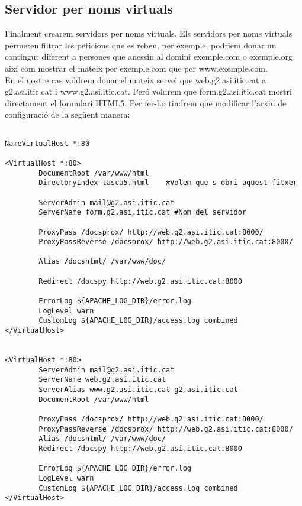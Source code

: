 \documentclass[11p]{article}
\begin{document}
\subsection{Servidor per noms virtuals}
Finalment crearem servidors per noms virtuals. Els servidors per noms virtuals permeten filtrar les peticions que es reben, per exemple, podriem donar un contingut diferent a persones que anessin al domini exemple.com o exemple.org així com mostrar el mateix per exemple.com que per www.exemple.com.\\
En el nostre cas voldrem donar el mateix servei que web.g2.asi.itic.cat a g2.asi.itic.cat i www.g2.asi.itic.cat. Peró voldrem que form.g2.asi.itic.cat mostri directament el formulari HTML5. Per fer-ho tindrem que modificar l'arxiu de configuració de la següent manera:
\begin{lstlisting}

NameVirtualHost *:80

<VirtualHost *:80>
        DocumentRoot /var/www/html
        DirectoryIndex tasca5.html    #Volem que s'obri aquest fitxer

        ServerAdmin mail@g2.asi.itic.cat
        ServerName form.g2.asi.itic.cat	#Nom del servidor

        ProxyPass /docsprox/ http://web.g2.asi.itic.cat:8000/
        ProxyPassReverse /docsprox/ http://web.g2.asi.itic.cat:8000/

        Alias /docshtml/ /var/www/doc/

        Redirect /docspy http://web.g2.asi.itic.cat:8000

        ErrorLog ${APACHE_LOG_DIR}/error.log
        LogLevel warn
        CustomLog ${APACHE_LOG_DIR}/access.log combined
</VirtualHost>


<VirtualHost *:80>
        ServerAdmin mail@g2.asi.itic.cat
        ServerName web.g2.asi.itic.cat
        ServerAlias www.g2.asi.itic.cat g2.asi.itic.cat
        DocumentRoot /var/www/html

        ProxyPass /docsprox/ http://web.g2.asi.itic.cat:8000/
        ProxyPassReverse /docsprox/ http://web.g2.asi.itic.cat:8000/
        Alias /docshtml/ /var/www/doc/
        Redirect /docspy http://web.g2.asi.itic.cat:8000

        ErrorLog ${APACHE_LOG_DIR}/error.log
        LogLevel warn
        CustomLog ${APACHE_LOG_DIR}/access.log combined
</VirtualHost>

\end{lstlisting}
\end{document}
